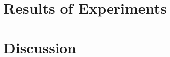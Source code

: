 \section{Results of Experiments}\label{sec:simu-results}
\section{Discussion}\label{sec:simu-discussion}

%
%
%
%
%
%
